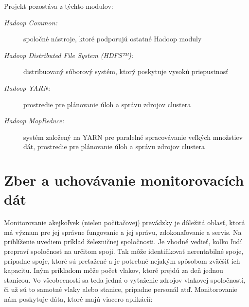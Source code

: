 \documentclass[11pt,final,oneside]{fithesis}
\begin{document}
Projekt pozostáva z týchto modulov:
\begin{description}
\item[\emph{Hadoop Common:}] spoločné nástroje, ktoré podporujú ostatné Hadoop moduly
\item[\emph{Hadoop Distributed File System (HDFS™):}] distribuovaný súborový systém, ktorý poskytuje vysokú priepustnosť
\item[\emph{Hadoop YARN:}] prostredie pre plánovanie úloh a správu zdrojov clustera
\item[\emph{Hadoop MapReduce:}] systém založený na YARN pre paralelné spracovávanie veľkých množstiev dát, prostredie pre plánovanie úloh a správu zdrojov clustera
\end{description}


\chapter{Zber a uchovávanie monitorovacích dát}
Monitorovanie akejkoľvek (nielen počítačovej) prevádzky je dôležitá oblasť, ktorá má význam pre jej správne fungovanie a jej správu, zdokonaľovanie a servis. Na priblíženie uvediem príklad železničnej spoločnosti. 
Je vhodné vedieť, koľko ľudí prepraví spoločnosť na určitom spoji. Tak môže identifikovať nerentabilné spoje, prípadne spoje, ktoré sú preťažené
a je potrebné nejakým spôsobom zväčšiť ich kapacitu. Iným príkladom môže počet vlakov, ktoré prejdú za deň jednou stanicou. Vo všeobecnosti sa teda jedná o vyťaženie zdrojov vlakovej spoločnosti, či už sú to samotné
vlaky alebo stanice, prípadne personál atď. Monitorovanie nám poskytuje dáta, ktoré majú viacero aplikácií:
\end{document}
